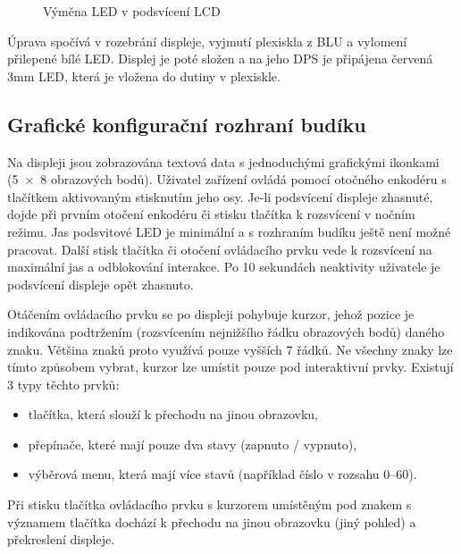 \begin{figure}[htbp]
    \caption{Výměna LED v podsvícení LCD}
    \label{fig:LCD modifikace}
\end{figure}

Úprava spočívá v rozebrání displeje, vyjmutí plexiskla z BLU a vylomení
přilepené bílé LED. Displej je poté složen a na jeho DPS je připájena červená
\num{3}\si{\milli\meter} LED, která je vložena do dutiny v plexiskle.


\subsection{Grafické konfigurační rozhraní budíku}
Na displeji jsou zobrazována textová data s jednoduchými grafickými ikonkami
(\num{5 x 8} obrazových bodů). Uživatel zařízení ovládá pomocí otočného
enkodéru s tlačítkem aktivovaným stisknutím jeho osy. Je-li podsvícení displeje
zhasnuté, dojde při prvním otočení enkodéru či stisku tlačítka k rozsvícení
v nočním režimu. Jas podsvitové LED je minimální a s rozhraním budíku ještě
není možné pracovat. Další stisk tlačítka či otočení ovládacího prvku vede
k rozsvícení na maximální jas a odblokování interakce.
Po \num{10} sekundách neaktivity uživatele je podsvícení displeje opět
zhasnuto.

Otáčením ovládacího prvku se po displeji pohybuje kurzor, jehož pozice je
indikována podtržením (rozsvícením nejnižšího řádku obrazových bodů) daného
znaku. Většina znaků proto využívá pouze vyšších \num{7} řádků. Ne všechny
znaky lze tímto způsobem vybrat, kurzor lze umístit pouze pod interaktivní
prvky. Existují 3 typy těchto prvků:
\begin{itemize}[nosep]
    \item tlačítka, která slouží k přechodu na jinou obrazovku,
    \item přepínače, které mají pouze dva stavy (zapnuto / vypnuto),
    \item výběrová menu, která mají více stavů (například číslo v rozsahu
        \numrange{0}{60}).
\end{itemize}

Při stisku tlačítka ovládacího prvku s kurzorem umístěným pod znakem s významem
tlačítka dochází k přechodu na jinou obrazovku (jiný pohled) a překreslení
displeje.

